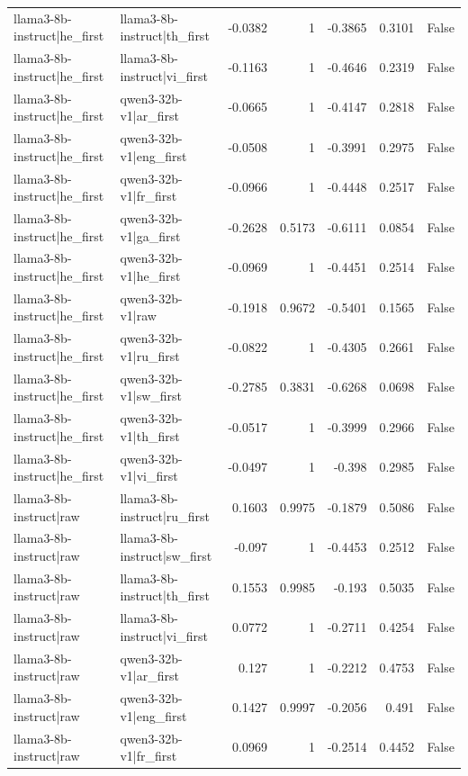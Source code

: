 \begin{table}
\begin{tabular}{l l r r r r l}
llama3-8b-instruct|he_first & llama3-8b-instruct|th_first & -0.0382 & 1 & -0.3865 & 0.3101 & False \\
llama3-8b-instruct|he_first & llama3-8b-instruct|vi_first & -0.1163 & 1 & -0.4646 & 0.2319 & False \\
llama3-8b-instruct|he_first & qwen3-32b-v1|ar_first & -0.0665 & 1 & -0.4147 & 0.2818 & False \\
llama3-8b-instruct|he_first & qwen3-32b-v1|eng_first & -0.0508 & 1 & -0.3991 & 0.2975 & False \\
llama3-8b-instruct|he_first & qwen3-32b-v1|fr_first & -0.0966 & 1 & -0.4448 & 0.2517 & False \\
llama3-8b-instruct|he_first & qwen3-32b-v1|ga_first & -0.2628 & 0.5173 & -0.6111 & 0.0854 & False \\
llama3-8b-instruct|he_first & qwen3-32b-v1|he_first & -0.0969 & 1 & -0.4451 & 0.2514 & False \\
llama3-8b-instruct|he_first & qwen3-32b-v1|raw & -0.1918 & 0.9672 & -0.5401 & 0.1565 & False \\
llama3-8b-instruct|he_first & qwen3-32b-v1|ru_first & -0.0822 & 1 & -0.4305 & 0.2661 & False \\
llama3-8b-instruct|he_first & qwen3-32b-v1|sw_first & -0.2785 & 0.3831 & -0.6268 & 0.0698 & False \\
llama3-8b-instruct|he_first & qwen3-32b-v1|th_first & -0.0517 & 1 & -0.3999 & 0.2966 & False \\
llama3-8b-instruct|he_first & qwen3-32b-v1|vi_first & -0.0497 & 1 & -0.398 & 0.2985 & False \\
llama3-8b-instruct|raw & llama3-8b-instruct|ru_first & 0.1603 & 0.9975 & -0.1879 & 0.5086 & False \\
llama3-8b-instruct|raw & llama3-8b-instruct|sw_first & -0.097 & 1 & -0.4453 & 0.2512 & False \\
llama3-8b-instruct|raw & llama3-8b-instruct|th_first & 0.1553 & 0.9985 & -0.193 & 0.5035 & False \\
llama3-8b-instruct|raw & llama3-8b-instruct|vi_first & 0.0772 & 1 & -0.2711 & 0.4254 & False \\
llama3-8b-instruct|raw & qwen3-32b-v1|ar_first & 0.127 & 1 & -0.2212 & 0.4753 & False \\
llama3-8b-instruct|raw & qwen3-32b-v1|eng_first & 0.1427 & 0.9997 & -0.2056 & 0.491 & False \\
llama3-8b-instruct|raw & qwen3-32b-v1|fr_first & 0.0969 & 1 & -0.2514 & 0.4452 & False \\

\end{tabular}
\end{table}
